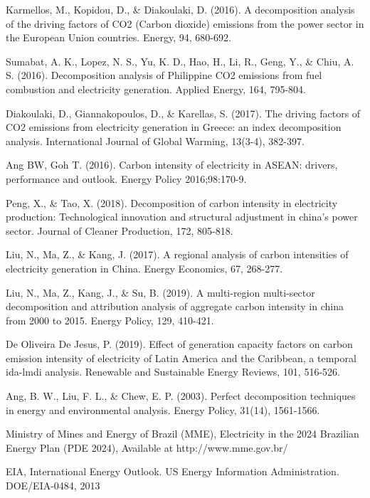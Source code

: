 \documentclass[energies,article,accept,moreauthors,12pt,a4paper]{mdpi} %
\begin{document}
\begin{thebibliography}{1}
 Karmellos, M., Kopidou, D., \& Diakoulaki, D. (2016). A decomposition analysis of the driving factors of CO2 (Carbon dioxide) emissions from the power sector in the European Union countries. Energy, 94, 680-692.

 Sumabat, A. K., Lopez, N. S., Yu, K. D., Hao, H., Li, R., Geng, Y., \& Chiu, A. S. (2016). Decomposition analysis of Philippine CO2 emissions from fuel combustion and electricity generation. Applied Energy, 164, 795-804.


 Diakoulaki, D., Giannakopoulos, D., \& Karellas, S. (2017). The driving factors of CO2 emissions from electricity generation in Greece: an index decomposition analysis. International Journal of Global Warming, 13(3-4), 382-397.


 Ang BW, Goh T. (2016). Carbon intensity of electricity in ASEAN: drivers, performance and outlook. Energy Policy 2016;98:170-9.

 Peng, X., \& Tao, X. (2018). Decomposition of carbon intensity in electricity production: Technological
innovation and structural adjustment in china's power sector. Journal of Cleaner Production, 172, 805-818. 

 Liu, N., Ma, Z., \& Kang, J. (2017). A regional analysis of carbon intensities of electricity generation in China. Energy Economics, 67, 268-277.

  Liu, N., Ma, Z., Kang, J., \& Su, B. (2019). A multi-region multi-sector decomposition and attribution
analysis of aggregate carbon intensity in china from 2000 to 2015. Energy Policy, 129, 410-421. 

 De Oliveira De Jesus, P. (2019). Effect of generation capacity factors on carbon emission intensity of electricity of Latin America and the Caribbean, a temporal ida-lmdi analysis. Renewable and
Sustainable Energy Reviews, 101, 516-526.   


  Ang, B. W., Liu, F. L., \& Chew, E. P. (2003). Perfect decomposition techniques in energy and environmental analysis. Energy Policy, 31(14), 1561-1566.



  Ministry of Mines and Energy of Brazil (MME), Electricity in the 2024 Brazilian
Energy Plan (PDE 2024), Available at http://www.mme.gov.br/


 EIA, International Energy Outlook. US Energy Information Administration. DOE/EIA-0484, 2013



\end{thebibliography}
\end{document}
